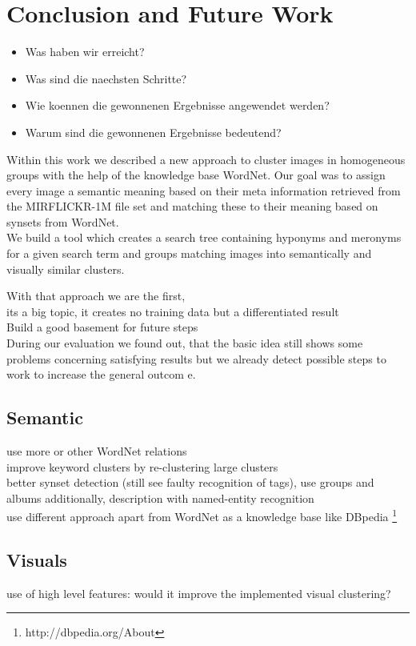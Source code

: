 %
\section{Conclusion and Future Work}
\label{sec_future}

\begin{itemize}
\item Was haben wir erreicht?
\item Was sind die naechsten Schritte?
\item Wie koennen die gewonnenen Ergebnisse angewendet werden?
\item Warum sind die gewonnenen Ergebnisse bedeutend?
\end{itemize}

Within this work we described a new approach to cluster images in homogeneous groups with the help of the knowledge base WordNet. Our goal was to assign every image a semantic meaning based on their meta information retrieved from the MIRFLICKR-1M file set and matching these to their meaning based on synsets from WordNet. \\
We build a tool which creates a search tree containing hyponyms and meronyms for a given search term and groups matching images into semantically and visually similar clusters. 

With that approach we are the first, \\
its a big topic, it creates no training data but a differentiated result \\
Build a good basement for future steps \\

During our evaluation we found out, that the basic idea still shows some problems concerning satisfying results but we already detect possible steps to work to increase the general outcom
e. 

\subsection{Semantic}
use more or other WordNet relations\\
improve keyword clusters by re-clustering large clusters\\
better synset detection (still see faulty recognition of tags), use groups and albums additionally, description with named-entity recognition \\
use different approach apart from WordNet as a knowledge base like DBpedia \footnote{http://dbpedia.org/About}

\subsection{Visuals}

use of high level features: would it improve the implemented visual clustering?
